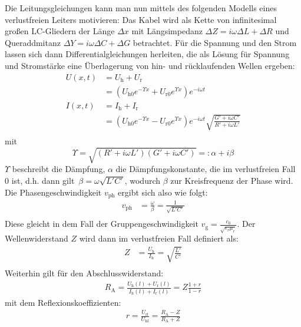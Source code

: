 \documentclass[ngerman]{scrartcl}
\theoremstyle{definition}
\begin{document}
		Die Leitungsgleichungen kann man nun mittels des folgenden Modells eines verlustfreien Leiters motivieren: Das Kabel wird als Kette von infinitesimal großen LC-Gliedern der Länge $\Delta x$ mit Längsimpedanz $\Delta Z = i \omega \Delta L + \Delta R$ und Queraddmitanz $\Delta Y = i \omega \Delta C + \Delta G$ betrachtet.
		Für die Spannung und den Strom lassen sich dann Differentialgleichungen herleiten, die als Lösung für Spannung und Stromstärke eine Überlagerung von hin- und rücklaufenden Wellen ergeben:
		\begin{align*}
			U(x,t) &= U_\mathrm{h} + U_\mathrm{r} \\
			&= (U_\mathrm{h0} e^{-\Upsilon x} + U_\mathrm{r0} e^{\Upsilon x}) e^{-i \omega t} \\
			I(x,t) &= I_\mathrm{h} + I_\mathrm{r} \\
			&= (U_\mathrm{h0} e^{-\Upsilon x} - U_\mathrm{r0} e^{\Upsilon x}) e^{-i \omega t} \sqrt{\frac{G' + i \omega C'}{R' + i \omega L'}} \\
		\end{align*}
		mit 
		\begin{equation*}
			\Upsilon = \sqrt{(R' + i \omega L')(G' + i \omega C')} =: \alpha + i \beta 
		\end{equation*}
		$\Upsilon$ beschreibt die Dämpfung, $\alpha$ die Dämpfungskonstante, die im verlustfreien Fall $0$ ist, d.h. dann gilt\ $\beta = \omega \sqrt{L'C'}$, wodurch $\beta$ zur Kreisfrequenz der Phase wird. Die Phasengeschwindigkeit $v_\mathrm{ph}$ ergibt sich also wie folgt:
		\begin{align*}
			v_\mathrm{ph} &= \frac{\omega}{\beta} = \frac{1}{\sqrt{L'C'}} \\
		\end{align*}
		Diese gleicht in dem Fall der Gruppengeschwindigkeit $v_\mathrm{g} = \frac{c_0}{\sqrt{\epsilon_r \mu_r}}$.
		Der Wellenwiderstand $Z$ wird dann im verlustfreien Fall definiert als:
		\begin{align*}
			Z &= \frac{U_\mathrm{h}}{I_\mathrm{h}} = \sqrt{\frac{L'}{C'}} \\ 
		\end{align*}
		Weiterhin gilt für den Abschlusswiderstand: 
		\begin{align*}
    		R_\mathrm{A}=\frac{U_\mathrm{h}(l)+U_\mathrm{r}(l)}{I_\mathrm{h}(l)+I_\mathrm{r}(l)}=Z\frac{1+r}{1-r}
		\end{align*}
		mit dem Reflexionskoeffizienten: 
		\begin{align*}
    		r = \frac{U_\mathrm{rl}}{U_\mathrm{hl}} = \frac{R_\mathrm{A}-Z}{R_\mathrm{A}+Z}
		\end{align*}
\end{document}
